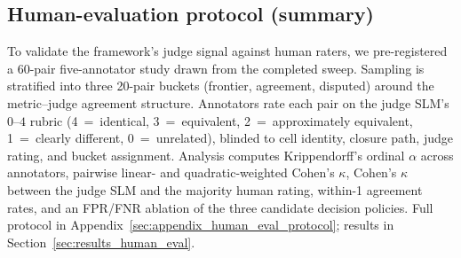 \subsection{Human-evaluation protocol (summary)}
\label{sec:experiment_setup_human_eval}

To validate the framework's judge signal against human raters, we
pre-registered a 60-pair five-annotator study drawn from the completed
sweep. Sampling is stratified into three 20-pair buckets (frontier,
agreement, disputed) around the metric--judge agreement structure.
Annotators rate each pair on the judge SLM's $0$--$4$ rubric (4~=~identical,
3~=~equivalent, 2~=~approximately equivalent, 1~=~clearly different,
0~=~unrelated), blinded to cell identity, closure path, judge rating, and
bucket assignment. Analysis computes Krippendorff's ordinal $\alpha$ across
annotators, pairwise linear- and quadratic-weighted Cohen's $\kappa$,
Cohen's $\kappa$ between the judge SLM and the majority human rating,
within-1 agreement rates, and an FPR/FNR ablation of the three candidate
decision policies. Full protocol in Appendix~\ref{sec:appendix_human_eval_protocol};
results in Section~\ref{sec:results_human_eval}.


